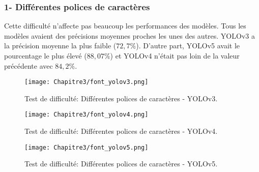 \subsubsection{1- Différentes polices de caractères}
          Cette difficulté n'affecte pas beaucoup les performances des modèles. Tous les modèles avaient des précisions moyennes proches les unes des autres. YOLOv3 a la précision moyenne la plus faible ($72,7\%$). D'autre part, YOLOv5 avait le pourcentage le plus élevé ($88,07\%$) et YOLOv4 n'était pas loin de la valeur précédente avec $84,2\%$.
          \begin{figure}[H]
                   \centering
                    \texttt{[image: Chapitre3/font\_yolov3.png]}
                    \caption{Test de difficulté: Différentes polices de caractères - YOLOv3.}
                    \label{y3_t1}
                    \end{figure}
          \begin{figure}[H]
                    \centering
                    \texttt{[image: Chapitre3/font\_yolov4.png]}
                    \caption{Test de difficulté: Différentes polices de caractères - YOLOv4.}
                    \label{y4_t2}
                    \end{figure}
          \begin{figure}[H]
                    \centering
                    \texttt{[image: Chapitre3/font\_yolov5.png]}
                    \caption{Test de difficulté: Différentes polices de caractères - YOLOv5.}
                    \label{y5_t2}
                    \end{figure}

